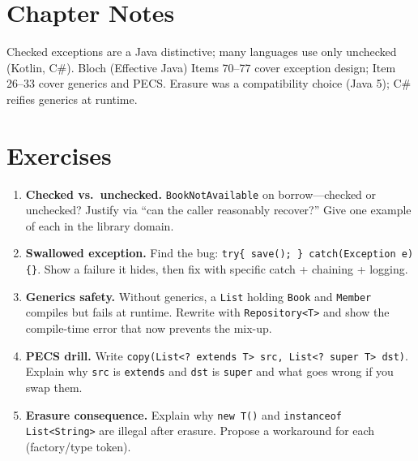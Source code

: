 \section{Chapter Notes}
Checked exceptions are a Java distinctive; many languages use only unchecked (Kotlin, C\#). Bloch (Effective Java) Items 70--77 cover exception design; Item 26--33 cover generics and PECS. Erasure was a compatibility choice (Java 5); C\# reifies generics at runtime.

\section{Exercises}
\label{sec:ch07-exercises}
\begin{enumerate}[label=E7.\arabic*, leftmargin=*, itemsep=0.8em]
    \item \textbf{Checked vs.\ unchecked.} \texttt{BookNotAvailable} on borrow---checked or unchecked? Justify via ``can the caller reasonably recover?'' Give one example of each in the library domain.
    \item \textbf{Swallowed exception.} Find the bug: \texttt{try\{ save(); \} catch(Exception e)\{\}}. Show a failure it hides, then fix with specific catch + chaining + logging.
    \item \textbf{Generics safety.} Without generics, a \texttt{List} holding \texttt{Book} and \texttt{Member} compiles but fails at runtime. Rewrite with \texttt{Repository<T>} and show the compile-time error that now prevents the mix-up.
    \item \textbf{PECS drill.} Write \texttt{copy(List<? extends T> src, List<? super T> dst)}. Explain why \texttt{src} is \texttt{extends} and \texttt{dst} is \texttt{super} and what goes wrong if you swap them.
    \item \textbf{Erasure consequence.} Explain why \texttt{new T()} and \texttt{instanceof List<String>} are illegal after erasure. Propose a workaround for each (factory/type token).
\end{enumerate}
